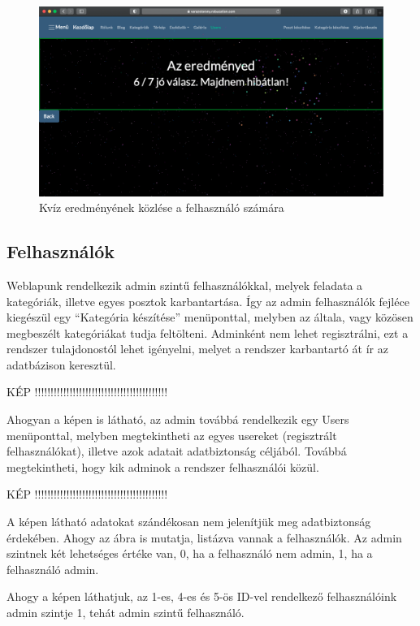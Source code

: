 \documentclass[
]{thesis-ekf}
\theoremstyle{definition}
\theoremstyle{remark}
\begin{document}
			\begin{figure}[ht]
				\centering
				\includegraphics[scale=0.30]{./images/quizresult}
				\caption{Kvíz eredményének közlése a felhasználó számára}
				\label{fig:result}
			\end{figure}
			
			
		\subsection{Felhasználók}
			\par Weblapunk rendelkezik admin szintű felhasználókkal, melyek feladata a kategóriák, illetve egyes posztok karbantartása. Így az admin felhasználók fejléce kiegészül egy “Kategória készítése” menüponttal, melyben az általa, vagy közösen megbeszélt kategóriákat tudja feltölteni. Adminként nem lehet regisztrálni, ezt a rendszer tulajdonostól lehet igényelni, melyet a rendszer karbantartó át ír az adatbázison keresztül.
			\par KÉP !!!!!!!!!!!!!!!!!!!!!!!!!!!!!!!!!!!!!!!!!!
			\par Ahogyan a képen is látható, az admin továbbá rendelkezik egy Users menüponttal, melyben megtekintheti az egyes usereket (regisztrált felhasználókat), illetve azok adatait adatbiztonság céljából. Továbbá megtekintheti, hogy kik adminok a rendszer felhasználói közül.
			\par KÉP !!!!!!!!!!!!!!!!!!!!!!!!!!!!!!!!!!!!!!!!!!
			\par A képen látható adatokat szándékosan nem jelenítjük meg adatbiztonság érdekében. Ahogy az ábra is mutatja, listázva vannak a felhasználók. Az admin szintnek két lehetséges értéke van, 0, ha a felhasználó nem admin, 1, ha a felhasználó admin.
			\par Ahogy a képen láthatjuk, az 1-es, 4-es és 5-ös ID-vel rendelkező felhasználóink admin szintje 1, tehát admin szintű felhasználó.
\end{document}
